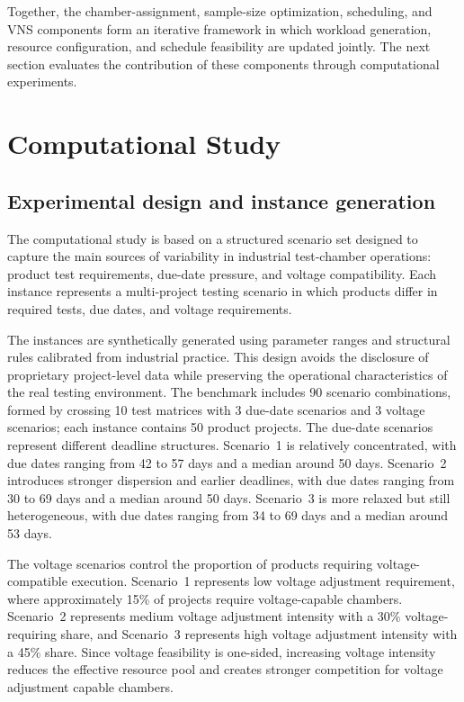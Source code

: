 \documentclass[11pt]{article}
\begin{document}
Together, the chamber-assignment, sample-size optimization, scheduling, and VNS components form an iterative framework in which workload generation, resource configuration, and schedule feasibility are updated jointly. The next section evaluates the contribution of these components through computational experiments.

\section{Computational Study}
\label{sec:computational_study}

\subsection{Experimental design and instance generation}
\label{subsec:exp_design}

The computational study is based on a structured scenario set designed to capture the main sources of variability in industrial test-chamber operations: product test requirements, due-date pressure, and voltage compatibility. Each instance represents a multi-project testing scenario in which products differ in required tests, due dates, and voltage requirements.

The instances are synthetically generated using parameter ranges and structural rules calibrated from industrial practice. This design avoids the disclosure of proprietary project-level data while preserving the operational characteristics of the real testing environment. The benchmark includes 90 scenario combinations, formed by crossing 10 test matrices with 3 due-date scenarios and 3 voltage scenarios; each instance contains 50 product projects.
The due-date scenarios represent different deadline structures. Scenario~1 is relatively concentrated, with due dates ranging from 42 to 57 days and a median around 50 days. Scenario~2 introduces stronger dispersion and earlier deadlines, with due dates ranging from 30 to 69 days and a median around 50 days. Scenario~3 is more relaxed but still heterogeneous, with due dates ranging from 34 to 69 days and a median around 53 days.

The voltage scenarios control the proportion of products requiring voltage-compatible execution. Scenario~1 represents low voltage adjustment requirement, where approximately 15\% of projects require voltage-capable chambers. Scenario~2 represents medium voltage adjustment intensity with a 30\% voltage-requiring share, and Scenario~3 represents high voltage adjustment intensity with a 45\% share. Since voltage feasibility is one-sided, increasing voltage intensity reduces the effective resource pool and creates stronger competition for voltage adjustment capable chambers.
\end{document}
